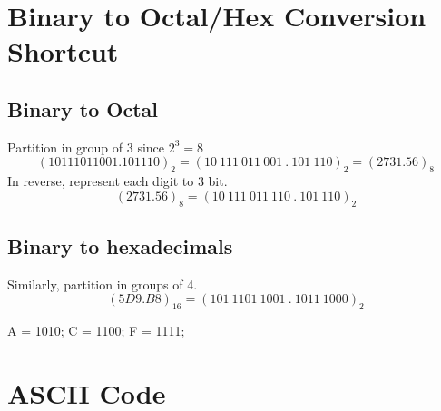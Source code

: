 \documentclass[12pt]{article} %
\begin{document}
\section{Binary to Octal/Hex Conversion Shortcut}

\subsection*{Binary to Octal} 
Partition in group of 3 since \(2^3 = 8\)
\[(10111011001.101110)_2 = (10\ 111\ 011\ 001\ .\ 101\ 110)_2 = (2731.56)_8\]
In reverse, represent each digit to 3 bit.
\[(2731.56)_8 = (10\ 111\ 011\ 110\ .\ 101\ 110)_2\]
\subsection*{Binary to hexadecimals}
Similarly, partition in groups of 4.
\[(5D9.B8)_{16} = (101\ 1101\ 1001\ .\ 1011\ 1000)_2\] 

A = 1010; C = 1100; F = 1111;

\section{ASCII Code}
\end{document}

